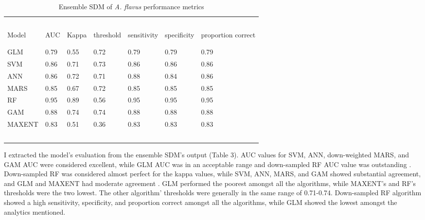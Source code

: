 \begin{table}[!ht]
    \caption{Ensemble SDM of \textit{A. flavus }performance metrics}
    \centering
    \begin{tabular}{lllllll}
    \hline
        ~ & ~ & ~ & ~ & ~ & ~ & ~ \\ 
              Model & AUC  & Kappa & threshold & sensitivity & specificity & proportion correct \\ \\
        \hline \hline \\
        GLM    & 0.79 & 0.55  & 0.72      & 0.79        & 0.79        & 0.79               \\
        SVM    & 0.86 & 0.71  & 0.73      & 0.86        & 0.86        & 0.86               \\
        ANN    & 0.86 & 0.72  & 0.71      & 0.88        & 0.84        & 0.86               \\
        MARS   & 0.85 & 0.67  & 0.72      & 0.85        & 0.85        & 0.85               \\
        RF     & 0.95 & 0.89  & 0.56      & 0.95        & 0.95        & 0.95               \\
        GAM    & 0.88 & 0.74  & 0.74      & 0.88        & 0.88        & 0.88               \\
        MAXENT & 0.83 & 0.51  & 0.36      & 0.83        & 0.83        & 0.83               \\
        ~ & ~ & ~ & ~ & ~ & ~ & ~ \\
        \hline %
    \end{tabular}
    \label{Ensemble SDM performance metrics}
\end{table}
I extracted the model's evaluation from the ensemble SDM's output (Table 3). AUC values for SVM, ANN, down-weighted MARS, and GAM AUC were considered excellent, while GLM AUC was in an acceptable range and down-sampled RF AUC value was outstanding \citep{mandrekar2010receiver}. Down-sampled RF was considered almost perfect for the kappa values, while SVM, ANN, MARS, and GAM showed substantial agreement, and GLM and MAXENT had moderate agreement \citep{mchugh2012interrater}. GLM performed the poorest amongst all the algorithms, while MAXENT's and RF's thresholds were the two lowest. The other algorithm' thresholds were generally in the same range of 0.71-0.74. Down-sampled RF algorithm showed a high sensitivity, specificity, and proportion correct amongst all the algorithms, while GLM showed the lowest amongst the analytics mentioned.

